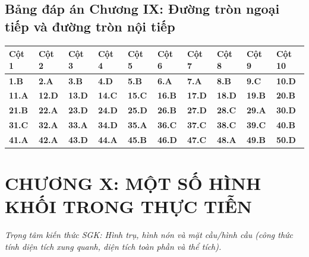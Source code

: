 \documentclass[11pt,a4paper]{article}
\begin{document}
\subsection*{\color{primary} Bảng đáp án Chương IX: Đường tròn ngoại tiếp và đường tròn nội tiếp}
\begin{center}
\renewcommand{\arraystretch}{1.25}
\begin{tabularx}{\textwidth}{*{10}{>{\centering\arraybackslash}X}}
\toprule
\textbf{\color{primary} Cột 1} & \textbf{\color{primary} Cột 2} & \textbf{\color{primary} Cột 3} & \textbf{\color{primary} Cột 4} & \textbf{\color{primary} Cột 5} & \textbf{\color{primary} Cột 6} & \textbf{\color{primary} Cột 7} & \textbf{\color{primary} Cột 8} & \textbf{\color{primary} Cột 9} & \textbf{\color{primary} Cột 10} \\
\midrule
\textbf{1.B} & \textbf{2.A} & \textbf{3.B} & \textbf{4.D} & \textbf{5.B} & \textbf{6.A} & \textbf{7.A} & \textbf{8.B} & \textbf{9.C} & \textbf{10.D} \\
\rowcolor{rowtint} \textbf{11.A} & \textbf{12.D} & \textbf{13.D} & \textbf{14.C} & \textbf{15.C} & \textbf{16.B} & \textbf{17.D} & \textbf{18.D} & \textbf{19.B} & \textbf{20.B} \\
\textbf{21.B} & \textbf{22.A} & \textbf{23.D} & \textbf{24.D} & \textbf{25.D} & \textbf{26.B} & \textbf{27.D} & \textbf{28.C} & \textbf{29.A} & \textbf{30.D} \\
\rowcolor{rowtint} \textbf{31.C} & \textbf{32.A} & \textbf{33.A} & \textbf{34.D} & \textbf{35.A} & \textbf{36.C} & \textbf{37.C} & \textbf{38.C} & \textbf{39.C} & \textbf{40.B} \\
\textbf{41.A} & \textbf{42.A} & \textbf{43.D} & \textbf{44.A} & \textbf{45.B} & \textbf{46.D} & \textbf{47.C} & \textbf{48.A} & \textbf{49.B} & \textbf{50.D} \\
\bottomrule
\end{tabularx}
\end{center}\vspace{10pt}
\section*{\color{primary} CHƯƠNG X: MỘT SỐ HÌNH KHỐI TRONG THỰC TIỄN}
\textit{Trọng tâm kiến thức SGK: Hình trụ, hình nón và mặt cầu/hình cầu (công thức tính diện tích xung quanh, diện tích toàn phần và thể tích).}\par\vspace{4pt}
\end{document}
